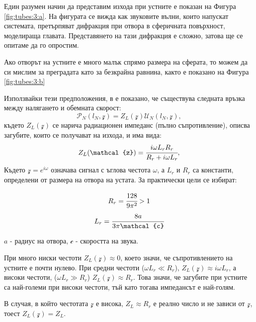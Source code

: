 \documentclass[main.tex]{subfiles}
\begin{document}
Един разумен начин да представим изхода при устните е показан на Фигура \autoref{fig:tubes:3:a}. На фигурата се вижда как звуковите вълни, които напускат системата, претърпяват дифракция при отвора в сферичната повърхност, моделираща главата. Представянето на тази дифракция е сложно, затова ще се опитаме да го опростим.

Ако отворът на устните е много малък спрямо размера на сферата, то можем да 
си мислим за преградата като за безкрайна равнина, както е показано на Фигура \autoref{fig:tubes:3:b}

Използвайки тези предположения, в \cite{rabiner_schafer78} е показано, че съществува следната връзка между налягането и обемната скорост:
\begin{equation}
    \label{eq:tubes:14}
    \mathcal{P}_N(l_N, \mathcal{z}) = Z_L(\mathcal{z}) \mathcal{U}_N(l_N, \mathcal{z}),
\end{equation}
където 
$Z_L(\mathcal{z})$ се нарича радиационен импеданс (пълно съпротивление), описва загубите, които се получават на изхода, и има вида:
\begin{align}
    \label{eq:tubes:impedance}
    Z_L(\mathcal{z}) = \cfrac{i\omega L_r R_r}{R_r + i\omega L_r},    
\end{align}
Където $\mathcal{z} = e^{i\omega}$ означава сигнал с ъглова честота $\omega$, а $L_r$ и $R_r$ са константи, определени от размера на отвора на устата. За практически цели се избират:

\begin{multicols}{2}
    \begin{equation*}
      R_r = \cfrac{128}{9\pi^2} > 1
    \end{equation*}\break
    \begin{equation*}
      L_r = \cfrac{8a}{3\pi \mathcal{c}}
    \end{equation*}
  \end{multicols}
$a$ - радиус на отвора, $\mathcal{c}$ - скоростта на звука.

При много ниски честоти $Z_L(\mathcal{z}) \approx 0$, което значи, че съпротивлението на устните е почти нулево.
При средни честоти ($\omega L_r \ll R_r$), $Z_L(\mathcal{z}) \approx i\omega L_r$, а високи честоти, ($\omega L_r \gg R_r$) $Z_L(\mathcal{z}) \approx R_r$. 
Това значи, че загубите при устните са най-големи при високи честоти, тъй като тогава импедансът е най-голям.

В случая, в който честотата $\mathcal{z}$ е висока, $Z_L \approx R_r$ е реално число  и не зависи от $\mathcal{z}$, тоест $Z_L(\mathcal{z}) = Z_L$. 
\end{document}
